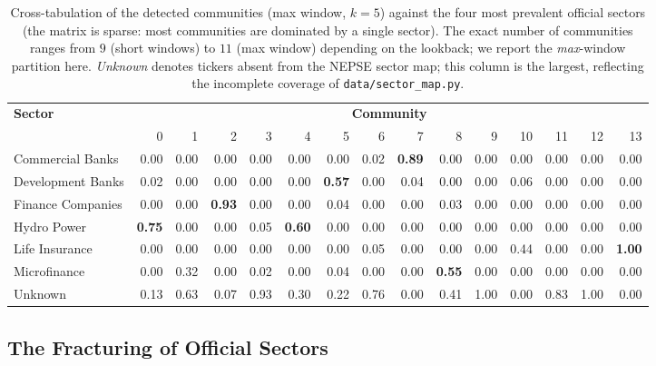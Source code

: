 \begin{table}[H]
\centering
\footnotesize
\caption{Cross-tabulation of the detected communities (max window, $k=5$)
against the four most prevalent official sectors (the matrix is sparse:
most communities are dominated by a single sector).  The exact number
of communities ranges from $9$ (short windows) to $11$ (max window)
depending on the lookback; we report the \emph{max}-window partition
here.  \emph{Unknown} denotes tickers absent from the NEPSE sector
map; this column is the largest, reflecting the incomplete coverage
of \texttt{data/sector\_map.py}.}
\label{tab:community-sector}
\begin{tabular}{l r r r r r r r r r r r r r r}
\toprule
\textbf{Sector} & \multicolumn{14}{c}{\textbf{Community}} \\
\cmidrule(lr){2-15}
& 0 & 1 & 2 & 3 & 4 & 5 & 6 & 7 & 8 & 9 & 10 & 11 & 12 & 13 \\
\midrule
Commercial Banks   & 0.00 & 0.00 & 0.00 & 0.00 & 0.00 & 0.00 & 0.02 & \textbf{0.89} & 0.00 & 0.00 & 0.00 & 0.00 & 0.00 & 0.00 \\
Development Banks  & 0.02 & 0.00 & 0.00 & 0.00 & 0.00 & \textbf{0.57} & 0.00 & 0.04 & 0.00 & 0.00 & 0.06 & 0.00 & 0.00 & 0.00 \\
Finance Companies  & 0.00 & 0.00 & \textbf{0.93} & 0.00 & 0.00 & 0.04 & 0.00 & 0.00 & 0.03 & 0.00 & 0.00 & 0.00 & 0.00 & 0.00 \\
Hydro Power        & \textbf{0.75} & 0.00 & 0.00 & 0.05 & \textbf{0.60} & 0.00 & 0.00 & 0.00 & 0.00 & 0.00 & 0.00 & 0.00 & 0.00 & 0.00 \\
Life Insurance     & 0.00 & 0.00 & 0.00 & 0.00 & 0.00 & 0.00 & 0.05 & 0.00 & 0.00 & 0.00 & 0.44 & 0.00 & 0.00 & \textbf{1.00} \\
Microfinance       & 0.00 & 0.32 & 0.00 & 0.02 & 0.00 & 0.04 & 0.00 & 0.00 & \textbf{0.55} & 0.00 & 0.00 & 0.00 & 0.00 & 0.00 \\
Unknown            & 0.13 & 0.63 & 0.07 & 0.93 & 0.30 & 0.22 & 0.76 & 0.00 & 0.41 & 1.00 & 0.00 & 0.83 & 1.00 & 0.00 \\
\bottomrule
\end{tabular}
\end{table}


\subsection{The Fracturing of Official Sectors}
\label{sec:results-fracturing}

